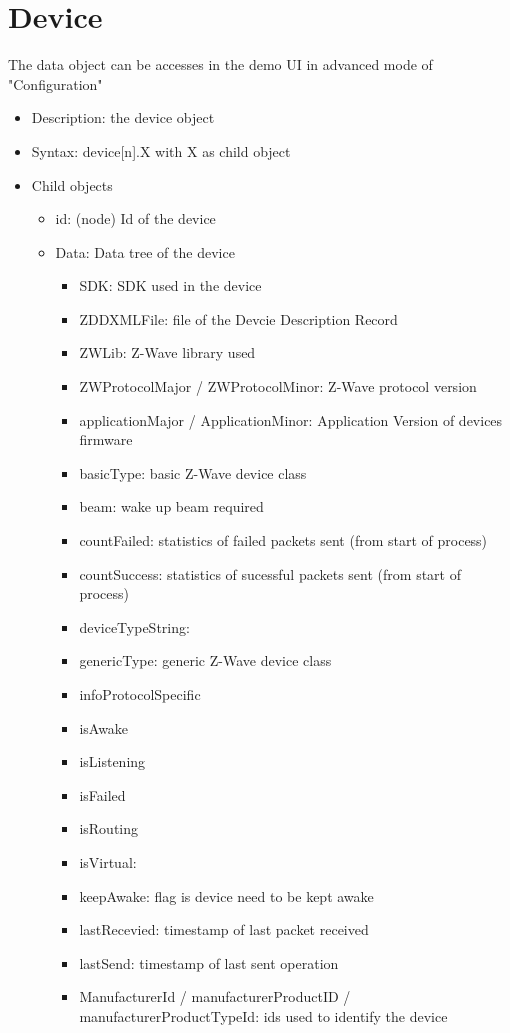 \section{Device}

The data object can be accesses in the demo UI in advanced mode of "Configuration"

\begin {itemize}
\item Description: the device object
\item Syntax:  device[n].X with  X as child object
\item Child objects
\begin {itemize}
\item id: (node) Id of the device
\item Data: Data tree of the device
\begin {itemize}
\item SDK: SDK used in the device
\item ZDDXMLFile: file of the Devcie Description Record
\item ZWLib: Z-Wave library used
\item ZWProtocolMajor / ZWProtocolMinor: Z-Wave protocol version
\item applicationMajor / ApplicationMinor: Application Version of devices firmware
\item basicType: basic Z-Wave device class
\item beam: wake up beam required
\item countFailed: statistics of failed packets sent (from start of process)
\item countSuccess: statistics of sucessful packets sent (from start of process)
\item deviceTypeString:
\item genericType: generic Z-Wave device class
\item infoProtocolSpecific
\item isAwake
\item isListening
\item isFailed
\item isRouting
\item isVirtual: 
\item keepAwake: flag is device need to be kept awake
\item lastRecevied:  timestamp of last packet received
\item lastSend:  timestamp of last sent operation
\item ManufacturerId / manufacturerProductID / manufacturerProductTypeId: ids used to identify the device

\end{itemize}
\end{itemize}
\end{itemize}
